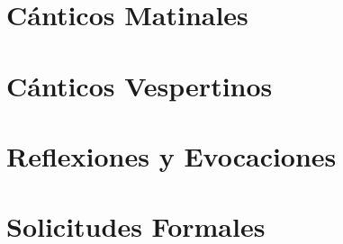 
\morningPartSettings

\part{Cánticos Matinales}

\morningChapterSettings



\morningSettingsRestore

\eveningPartSettings

\part{Cánticos Vespertinos}

\eveningChapterSettings



\eveningSettingsRestore


\part{Reflexiones y Evocaciones}





\requestsPartSettings


\part{Solicitudes Formales}

\requestsChapterSettings



\requestsSettingsRestore
